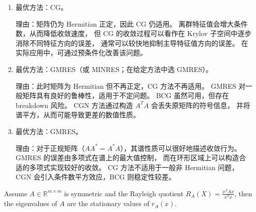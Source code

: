 \documentclass{ctexart}
\begin{document}
\begin{solution}
\begin{enumerate}
    \item

      最优方法：CG。

      理由：矩阵仍为 Hermitian 正定，因此 CG 仍适用。
      离群特征值会增大条件数，从而降低收敛速度，
      但 CG 的收敛过程可以看作在 Krylov 子空间中逐步消除不同特征方向的误差，
      通常可以较快地抑制主导特征值方向的误差。
      在实际应用中，可通过预条件化改善该问题。

    \item

      最优方法：GMRES（或 MINRES；在给定方法中选 GMRES）。

      理由：此时矩阵为 Hermitian 但不再正定，CG 方法不再适用。
      GMRES 对一般矩阵具有良好的鲁棒性，适用于不定问题。
      BCG 虽然可用，但存在 breakdown 风险。
      CGN 方法通过构造 $A^TA$ 会丢失原矩阵的符号信息，
      并将谱平方，从而可能导致更差的数值性质。

    \item

      最优方法：GMRES。

      理由：对于正规矩阵（$AA^*=A^*A$），其谱性质可以很好地描述收敛行为。
      GMRES 的误差由多项式在谱上的最大值控制，
      而在环形区域上可以构造合适的多项式实现较好的收敛。
      CG 方法不适用于一般非 Hermitian 问题，
      CGN 会引入条件数平方效应，BCG 则稳定性较差。

  \end{enumerate}
\end{solution}
\begin{problem}
  Assume \(A \in \mathbb{R}^{m \times m} \) is symmetric and the Rayleigh quotient \(R_A(X)=\frac{x^T A x}{x^T x} \), then
  the eigenvalues of \(A \) are the stationary values of \(r_A(x) \).
\end{problem}
\end{document}
